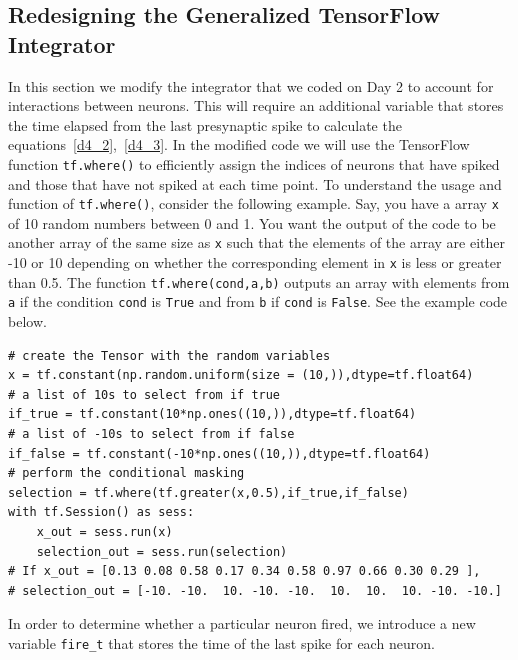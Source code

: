 \documentclass[10pt,letterpaper]{article}
\begin{document}
\begin{nolinenumbers}
\subsection*{Redesigning the Generalized TensorFlow Integrator}
In this section we modify the integrator that we coded on Day 2 to account for interactions between neurons. This will require an additional variable that stores the time elapsed from the last presynaptic spike to calculate the  equations~\ref{d4_2},~\ref{d4_3}. In the modified code we will use the TensorFlow function \texttt{tf.where()} to efficiently assign the indices of neurons that have spiked and those that have not spiked at each time point. To understand the usage and function of \texttt{tf.where()}, consider the following example. Say, you have a array \texttt{x} of 10 random numbers between 0 and 1. You want the output of the code to be another array of the same size as \texttt{x} such that the elements of the array are either -10 or 10 depending on whether the corresponding element in \texttt{x} is less or greater than 0.5. The function  \texttt{tf.where(cond,a,b)} outputs an array with elements from \texttt{a} if the condition \texttt{cond} is \texttt{True} and from \texttt{b} if \texttt{cond} is \texttt{False}. See the example code below.

\begin{verbatim}
# create the Tensor with the random variables
x = tf.constant(np.random.uniform(size = (10,)),dtype=tf.float64)
# a list of 10s to select from if true
if_true = tf.constant(10*np.ones((10,)),dtype=tf.float64)
# a list of -10s to select from if false
if_false = tf.constant(-10*np.ones((10,)),dtype=tf.float64)
# perform the conditional masking
selection = tf.where(tf.greater(x,0.5),if_true,if_false)
with tf.Session() as sess:
    x_out = sess.run(x)
    selection_out = sess.run(selection)
# If x_out = [0.13 0.08 0.58 0.17 0.34 0.58 0.97 0.66 0.30 0.29 ],
# selection_out = [-10. -10.  10. -10. -10.  10.  10.  10. -10. -10.]
\end{verbatim}

In order to determine whether a particular neuron fired, we introduce a new variable \texttt{fire\_t} that stores the time of the last spike for each neuron. 


\end{nolinenumbers}
\end{document}
